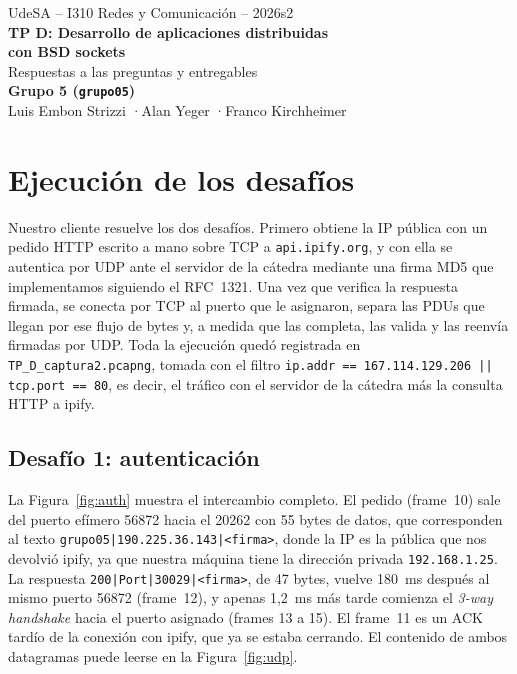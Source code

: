 \documentclass[11pt,a4paper]{article}
\newcommand{\code}[1]{\texttt{#1}}
\begin{document}
\begin{center}
  {\small UdeSA -- I310 Redes y Comunicación -- 2026s2}\\[0.8em]
  {\LARGE\bfseries TP D: Desarrollo de aplicaciones distribuidas\\[0.2em] con BSD sockets}\\[0.8em]
  {\large Respuestas a las preguntas y entregables}\\[0.8em]
  {\bfseries Grupo 5 (\code{grupo05})}\\[0.3em]
  Luis Embon Strizzi \quad·\quad Alan Yeger \quad·\quad Franco Kirchheimer
\end{center}

\tableofcontents

\section{Ejecución de los desafíos}

Nuestro cliente resuelve los dos desafíos. Primero obtiene la IP pública con un pedido HTTP escrito a mano sobre TCP a \code{api.ipify.org}, y con ella se autentica por UDP ante el servidor de la cátedra mediante una firma MD5 que implementamos siguiendo el RFC~1321. Una vez que verifica la respuesta firmada, se conecta por TCP al puerto que le asignaron, separa las PDUs que llegan por ese flujo de bytes y, a medida que las completa, las valida y las reenvía firmadas por UDP. Toda la ejecución quedó registrada en \code{TP\_D\_captura2.pcapng}, tomada con el filtro \code{ip.addr == 167.114.129.206 || tcp.port == 80}, es decir, el tráfico con el servidor de la cátedra más la consulta HTTP a ipify.

\subsection{Desafío 1: autenticación}

La Figura~\ref{fig:auth} muestra el intercambio completo. El pedido (frame~10) sale del puerto efímero 56872 hacia el 20262 con 55 bytes de datos, que corresponden al texto \code{grupo05|190.225.36.143|<firma>}, donde la IP es la pública que nos devolvió ipify, ya que nuestra máquina tiene la dirección privada \code{192.168.1.25}. La respuesta \code{200|Port|30029|<firma>}, de 47 bytes, vuelve 180~ms después al mismo puerto 56872 (frame~12), y apenas 1,2~ms más tarde comienza el \emph{3-way handshake} hacia el puerto asignado (frames 13 a 15). El frame~11 es un ACK tardío de la conexión con ipify, que ya se estaba cerrando. El contenido de ambos datagramas puede leerse en la Figura~\ref{fig:udp}.
\end{document}
